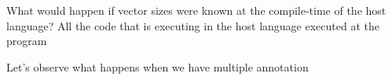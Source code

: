 
What would happen if vector sizes were known at the compile-time of the host language?
All the code that is executing in the host language executed at the program

Let's observe what happens when we have multiple annotation











